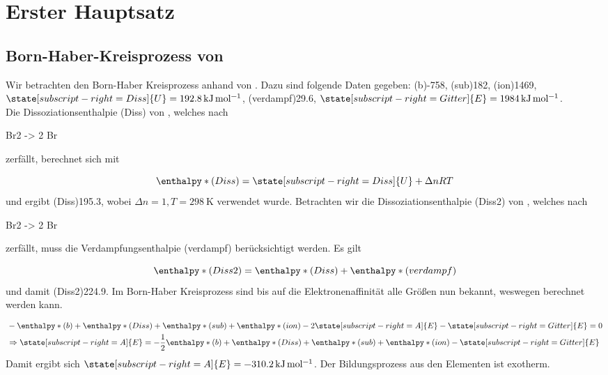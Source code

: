 \section{Erster Hauptsatz}

  \subsection{Born-Haber-Kreisprozess von }
  
    Wir betrachten den Born-Haber Kreisprozess anhand von . Dazu sind folgende Daten gegeben: \enthalpy(b){-758}, \enthalpy(sub){182}, \enthalpy(ion){1469}, $\state[subscript-right=Diss]{U} = \SI[mode=text]{192.8}{\kilo\joule\per\mole}$, \enthalpy(verdampf){29.6}, $\state[subscript-right=Gitter]{E} = \SI[mode=text]{1984}{\kilo\joule\per\mole}$. \\
    
    Die Dissoziationsenthalpie \enthalpy*(Diss){} von , welches nach 
    
    \begin{reaction}
      Br2 \gas -> 2 Br\gas
    \end{reaction}
    zerfällt, berechnet sich mit 
    
      \begin{equation}
        \enthalpy*(Diss){} = \state[subscript-right=Diss]{U} + \Delta n RT
      \end{equation}
    und ergibt \enthalpy(Diss){195.3}, wobei $\Delta n = 1, T = \SI[mode=text]{298}{\kelvin}$ verwendet wurde. Betrachten wir die Dissoziationsenthalpie \enthalpy*(Diss2){} von , welches nach 
    
     \begin{reaction}
       Br2 \lqd -> 2 Br\gas     
     \end{reaction}
     zerfällt, muss die Verdampfungsenthalpie \enthalpy*(verdampf){} berücksichtigt werden. Es gilt
     
       \begin{equation}
         \enthalpy*(Diss2){} = \enthalpy*(Diss){} + \enthalpy*(verdampf){}
       \end{equation}
     und damit \enthalpy(Diss2){224.9}. Im Born-Haber Kreisprozess sind bis auf die Elektronenaffinität  alle Größen nun bekannt, weswegen  berechnet werden kann. 
    
      \begin{equation}
        \begin{split}
        &- \enthalpy*(b){} + \enthalpy*(Diss){} + \enthalpy*(sub){} + \enthalpy*(ion){} - 2 \state[subscript-right=A]{E} - \state[subscript-right=Gitter]{E} = 0 \\
        &\Rightarrow \state[subscript-right=A]{E} = - \frac{1}{2} \enthalpy*(b){} + \enthalpy*(Diss){} + \enthalpy*(sub){} + \enthalpy*(ion){} - \state[subscript-right=Gitter]{E}
        \end{split}
      \end{equation}
    Damit ergibt sich $\state[subscript-right=A]{E} = \SI[mode=text]{-310.2}{\kilo\joule\per\mole}$. Der Bildungsprozess aus den Elementen ist exotherm.
      
  
    